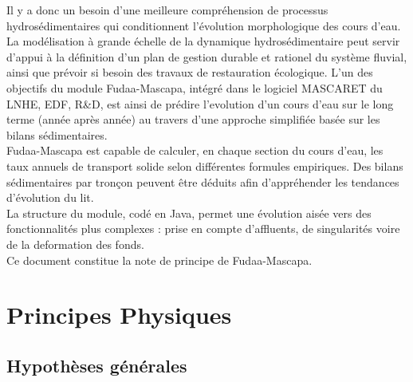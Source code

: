 \documentclass[a4paper,10pt]{article}
\begin{document}
\noindent
Il y a donc un besoin d'une meilleure compr\'ehension de processus hydros\'edimentaires qui conditionnent l'\'evolution morphologique des cours d'eau. \\

\noindent
La mod\'elisation \`a grande \'echelle de la dynamique hydros\'edimentaire peut servir d'appui \`a la d\'efinition d'un plan de gestion durable et rationel du syst\`eme fluvial, ainsi que pr\'evoir si besoin des travaux de restauration \'ecologique. L'un des objectifs du module Fudaa-Mascapa, int\'egr\'e dans le logiciel MASCARET du LNHE, EDF, R\&D, est ainsi de pr\'edire l'evolution d'un cours d'eau sur le long terme (ann\'ee apr\`es ann\'ee) au travers d'une approche simplifi\'ee bas\'ee sur les bilans s\'edimentaires. \\

\noindent
Fudaa-Mascapa est capable de calculer, en chaque section du cours d'eau, les taux annuels de transport solide selon diff\'erentes formules empiriques. Des bilans s\'edimentaires par tron\c con peuvent \^etre d\'eduits afin d'appr\'ehender les tendances d'\'evolution du lit. \\

\noindent
La structure du module, cod\'e en Java, permet une \'evolution ais\'ee vers des fonctionnalit\'es plus complexes : prise en compte d'affluents, de singularit\'es voire de la deformation des fonds. \\

\noindent
Ce document constitue la note de principe de Fudaa-Mascapa.


\section{Principes Physiques}


\subsection{Hypoth\`eses g\'en\'erales}
\end{document}
